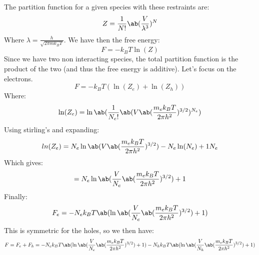 The partition function for a given species with these restraints are:
\begin{equation}
    Z = \frac{1}{N!}\ab(\frac{V}{\lambda^3})^N
\end{equation}
Where $\lambda = \frac{h}{\sqrt{2\pi m k_B T}}$. We have then the free energy:
\begin{equation}
    F = -k_B T \ln(Z)
\end{equation}
Since we have two non interacting species, the total partition function is the product of the two (and thus the free energy is additive). Let's focus on the electrons.
\begin{equation}
    F = -k_B T(\ln(Z_e) + \ln(Z_h))
\end{equation}
Where:
\begin{equation}
    \ln(Z_e) = \ln\ab(\frac{1}{N_e!}\ab(V\ab(\frac{m_e k_B T}{2\pi h^2})^{3/2})^{N_e})
\end{equation}
Using stirling's and expanding:
\begin{equation}
    ln(Z_e) = N_e\ln\ab(V\ab(\frac{m_e k_B T}{2\pi h^2})^{3/2}) - N_e\ln(N_e) +1 N_e
\end{equation}
Which gives:
\begin{equation}
    = N_e\ln\ab(\frac{V}{N_e}\ab(\frac{m_e k_B T}{2\pi h^2})^{3/2})+1
\end{equation}
Finally:
\begin{equation}
    F_e = -N_e k_B T\ab(\ln\ab(\frac{V}{N_e}\ab(\frac{m_e k_B T}{2\pi h^2})^{3/2})+1)
\end{equation}
This is symmetric for the holes, so we then have:
\begin{equation}
    F = F_e + F_h = -N_e k_B T\ab(\ln\ab(\frac{V}{N_e}\ab(\frac{m_e k_B T}{2\pi h^2})^{3/2})+1) - N_h k_B T\ab(\ln\ab(\frac{V}{N_h}\ab(\frac{m_e k_B T}{2\pi h^2})^{3/2})+1)
\end{equation}
